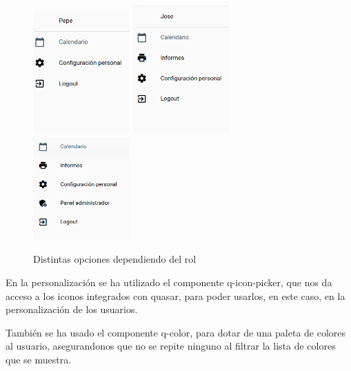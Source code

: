 \documentclass[11pt,spanish,listoffigures,listoftables]{tfgetsinf}
\begin{document}
\begin{figure}[ht!] %
  \includegraphics[width=0.33\textwidth]{img/menubase.png}
  \includegraphics[width=0.33\textwidth]{img/menuresp.png}
  \includegraphics[width=0.33\textwidth]{img/menuadmin.png}
  \caption{Distintas opciones dependiendo del rol}
  \label{fig:menurol}
\end{figure}

En la personalización se ha utilizado el componente q-icon-picker, que nos da acceso a los iconos integrados con quasar, para poder usarlos, en este caso, en la personalización de los usuarios. 

También se ha usado el componente q-color, para dotar de una paleta de colores al usuario, asegurandonos que no se repite ninguno al filtrar la lista de colores que se muestra.
\end{document}
